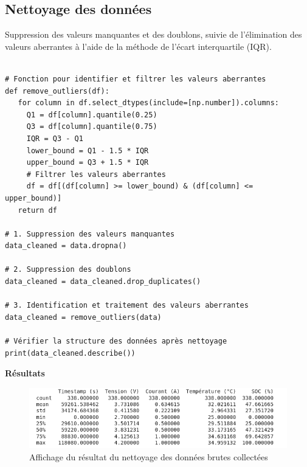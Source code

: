 \subsection{Nettoyage des données}
Suppression des valeurs manquantes et des doublons, suivie de l’élimination des valeurs aberrantes à l’aide de la méthode de l’écart interquartile (IQR).
\begin{verbatim}

# Fonction pour identifier et filtrer les valeurs aberrantes
def remove_outliers(df):
   for column in df.select_dtypes(include=[np.number]).columns:
     Q1 = df[column].quantile(0.25)
     Q3 = df[column].quantile(0.75)
     IQR = Q3 - Q1
     lower_bound = Q1 - 1.5 * IQR
     upper_bound = Q3 + 1.5 * IQR
     # Filtrer les valeurs aberrantes
     df = df[(df[column] >= lower_bound) & (df[column] <= upper_bound)]
   return df
	
# 1. Suppression des valeurs manquantes
data_cleaned = data.dropna()
	
# 2. Suppression des doublons
data_cleaned = data_cleaned.drop_duplicates()
	
# 3. Identification et traitement des valeurs aberrantes
data_cleaned = remove_outliers(data)
	
# Vérifier la structure des données après nettoyage
print(data_cleaned.describe())
\end{verbatim}
\textbf{Résultats}
\begin{figure}[H]
	\centering
	\includegraphics[width=16cm]{./img/resultats/netoyage.png}
	\caption{Affichage du résultat du nettoyage des données brutes collectées}
	
\end{figure}
